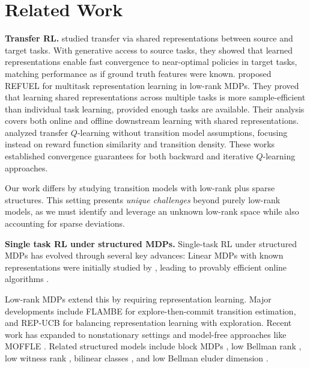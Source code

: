 \section{Related Work}
\noindent
\textbf{Transfer RL.}
\cite{agarwal2023provable} studied transfer via shared representations between source and target tasks. With generative access to source tasks, they showed that learned representations enable fast convergence to near-optimal policies in target tasks, matching performance as if ground truth features were known. \cite{cheng2022provable} proposed REFUEL for multitask representation learning in low-rank MDPs. They proved that learning shared representations across multiple tasks is more sample-efficient than individual task learning, provided enough tasks are available. Their analysis covers both online and offline downstream learning with shared representations.
\cite{chen2022transfer,chen2024data,chai2025deep} analyzed transfer $Q$-learning without transition model assumptions, focusing instead on reward function similarity and transition density. These works established convergence guarantees for both backward and iterative $Q$-learning approaches.

Our work differs by studying transition models with low-rank plus sparse structures. This setting presents {\em unique challenges} beyond purely low-rank models, as we must identify and leverage an unknown low-rank space while also accounting for sparse deviations.


\smallskip
\noindent
\textbf{Single task RL under structured MDPs.}
Single-task RL under structured MDPs has evolved through several key advances:
Linear MDPs with known representations were initially studied by \cite{yang2020reinforcement}, leading to provably efficient online algorithms \citep{sun2019model,jin2020provably,zanette2020learning,neu2020unifying,cai2020provably,wang2019optimism}.

Low-rank MDPs extend this by requiring representation learning. Major developments include FLAMBE \citep{agarwal2020flambe} for explore-then-commit transition estimation, and REP-UCB \citep{uehara2022representation} for balancing representation learning with exploration. Recent work has expanded to nonstationary settings \citep{cheng2023provably} and model-free approaches like MOFFLE \citep{modi2024model}.
Related structured models include block MDPs \citep{du2019provably,misra2020kinematic,zhang2022efficient}, low Bellman rank \citep{jiang2017contextual}, low witness rank \citep{sun2019model}, bilinear classes \citep{du2021bilinear}, and low Bellman eluder dimension \citep{jin2021bellman}.

